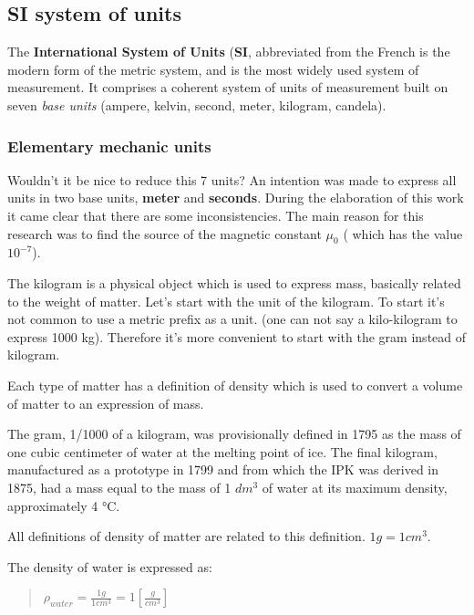 \documentclass[]{article}
\date{}
\begin{document}
\hypertarget{header-n0}{%
\subsection{SI system of units}\label{header-n0}}

The \textbf{International System of Units} (\textbf{SI}, abbreviated
from the French is the modern form of the metric system, and is the most
widely used system of measurement. It comprises a coherent system of
units of measurement built on seven \emph{base units} (ampere, kelvin,
second, meter, kilogram, candela).

\hypertarget{header-n3}{%
\subsubsection{Elementary mechanic units}\label{header-n3}}

Wouldn't it be nice to reduce this 7 units? An intention was made to
express all units in two base units, \textbf{meter} and
\textbf{seconds}. During the elaboration of this work it came clear that
there are some inconsistencies. The main reason for this research was to
find the source of the magnetic constant \(\mu_0\) ( which has the value
\(10^{-7}\)).

The kilogram is a physical object which is used to express mass,
basically related to the weight of matter. Let's start with the unit of
the kilogram. To start it's not common to use a metric prefix as a unit.
(one can not say a kilo-kilogram to express 1000 kg). Therefore it's
more convenient to start with the gram instead of kilogram.

Each type of matter has a definition of density which is used to convert
a volume of matter to an expression of mass.

The gram, 1/1000 of a kilogram, was provisionally defined in 1795 as the
mass of one cubic centimeter of water at the melting point of ice. The
final kilogram, manufactured as a prototype in 1799 and from which the
IPK was derived in 1875, had a mass equal to the mass of 1 \(dm^3\) of
water at its maximum density, approximately 4 °C.

All definitions of density of matter are related to this definition.
\(1 g = 1 cm^3\).

The density of water is expressed as:

\begin{quote}
\(\rho_{water} = \frac{1g}{1cm^3} = 1 [\frac{g}{cm^3}]\)
\end{quote}
\end{document}
